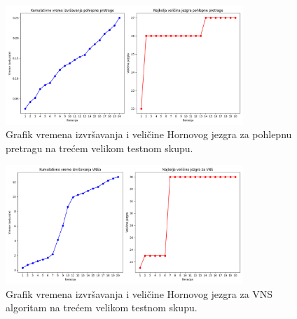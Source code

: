 \documentclass[12pt,oneside]{memoir}
\begin{document}
\begin{figure}[H]
    \centering
    \includegraphics[width=0.8\textwidth]{test3_greedy_performance.png}
    \caption{Grafik vremena izvršavanja i veličine Hornovog jezgra za pohlepnu pretragu na trećem velikom testnom skupu.}
    \label{fig:test3_greedy_performance}
\end{figure}

\begin{figure}[H]
    \centering
    \includegraphics[width=0.8\textwidth]{test3_vns_performance.png}
    \caption{Grafik vremena izvršavanja i veličine Hornovog jezgra za VNS algoritam na trećem velikom testnom skupu.}
    \label{fig:test3_vns_performance}
\end{figure}
\end{document}
